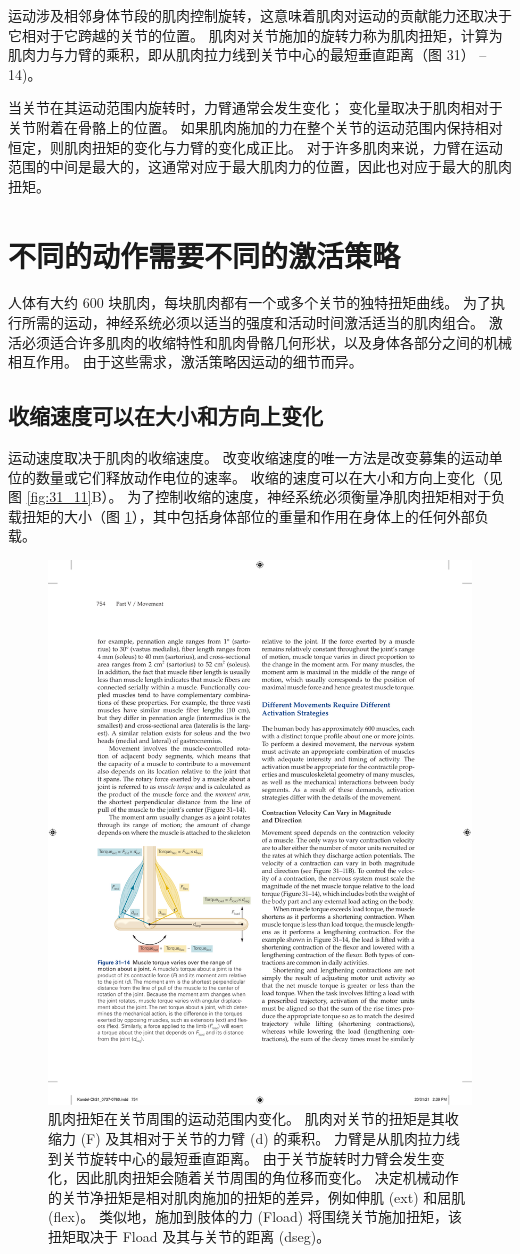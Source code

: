 运动涉及相邻身体节段的肌肉控制旋转，这意味着肌肉对运动的贡献能力还取决于它相对于它跨越的关节的位置。
肌肉对关节施加的旋转力称为肌肉扭矩，计算为肌肉力与力臂的乘积，即从肌肉拉力线到关节中心的最短垂直距离（图 31） –14)。


当关节在其运动范围内旋转时，力臂通常会发生变化；
变化量取决于肌肉相对于关节附着在骨骼上的位置。
如果肌肉施加的力在整个关节的运动范围内保持相对恒定，则肌肉扭矩的变化与力臂的变化成正比。
对于许多肌肉来说，力臂在运动范围的中间是最大的，这通常对应于最大肌肉力的位置，因此也对应于最大的肌肉扭矩。


\section{不同的动作需要不同的激活策略}

人体有大约 600 块肌肉，每块肌肉都有一个或多个关节的独特扭矩曲线。
为了执行所需的运动，神经系统必须以适当的强度和活动时间激活适当的肌肉组合。
激活必须适合许多肌肉的收缩特性和肌肉骨骼几何形状，以及身体各部分之间的机械相互作用。
由于这些需求，激活策略因运动的细节而异。


\subsection{收缩速度可以在大小和方向上变化}

运动速度取决于肌肉的收缩速度。
改变收缩速度的唯一方法是改变募集的运动单位的数量或它们释放动作电位的速率。
收缩的速度可以在大小和方向上变化（见图 \ref{fig:31_11}B）。
为了控制收缩的速度，神经系统必须衡量净肌肉扭矩相对于负载扭矩的大小（图 \ref{fig:31_14}），其中包括身体部位的重量和作用在身体上的任何外部负载。


\begin{figure}[htbp]
	\centering
	\includegraphics[width=0.5\linewidth]{chap31/fig_31_14}
	\caption{肌肉扭矩在关节周围的运动范围内变化。 肌肉对关节的扭矩是其收缩力 (F) 及其相对于关节的力臂 (d) 的乘积。 力臂是从肌肉拉力线到关节旋转中心的最短垂直距离。 由于关节旋转时力臂会发生变化，因此肌肉扭矩会随着关节周围的角位移而变化。 决定机械动作的关节净扭矩是相对肌肉施加的扭矩的差异，例如伸肌 (ext) 和屈肌 (flex)。 类似地，施加到肢体的力 (Fload) 将围绕关节施加扭矩，该扭矩取决于 Fload 及其与关节的距离 (dseg)。}
	\label{fig:31_14}
\end{figure}

